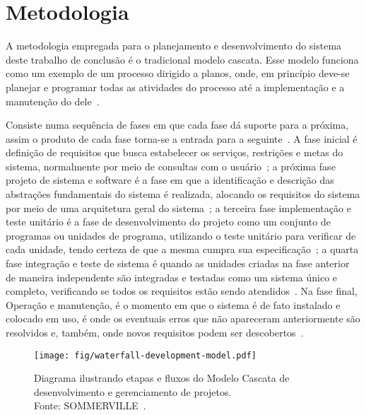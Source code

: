 \chapter{Metodologia}

A metodologia empregada para o planejamento e desenvolvimento do sistema deste trabalho de conclusão é o tradicional modelo cascata.
Esse modelo funciona como um exemplo de um processo dirigido a planos, onde, em princípio deve-se planejar e programar todas as atividades do processo até a implementação e a manutenção do dele~\cite{SOMMERVILLE1}.

Consiste numa sequência de fases em que cada fase dá suporte para a próxima, assim o produto de cada fase torna-se a entrada para a seguinte~\cite{BALTZAN1}.
A fase inicial é definição de requisitos que busca estabelecer os serviços, restrições e metas do sistema, normalmente por meio de consultas com o usuário~\cite{SOMMERVILLE1}; a próxima fase projeto de sistema e software é a fase em que a identificação e descrição das abstrações fundamentais do sistema é realizada, alocando os requisitos do sistema por meio de uma arquitetura geral do sistema~\cite{SOMMERVILLE1}; a terceira fase implementação e teste unitário é a fase de desenvolvimento do projeto como um conjunto de programas ou unidades de programa, utilizando o teste unitário para verificar de cada unidade, tendo certeza de que a mesma cumpra sua especificação~\cite{SOMMERVILLE1}; a quarta fase integração e teste de sistema é quando as unidades criadas na fase anterior de maneira independente são integradas e testadas como um sistema único e completo, verificando se todos os requisitos estão sendo atendidos~\cite{SOMMERVILLE1}.
Na fase final, Operação e manutenção, é o momento em que o sistema é de fato instalado e colocado em uso, é onde os eventuais erros que não apareceram anteriormente são resolvidos e, também, onde novos requisitos podem ser descobertos~\cite{SOMMERVILLE1}.

\begin{figure}[H]
    \centering
    \texttt{[image: fig/waterfall-development-model.pdf]}
    \caption[Waterfall development model]{\label{fig:Modelo_Cascata}
        Diagrama ilustrando etapas e fluxos do Modelo Cascata de desenvolvimento e gerenciamento de projetos.\\
        Fonte: SOMMERVILLE~\cite{SOMMERVILLE1}.
    }
\end{figure}

